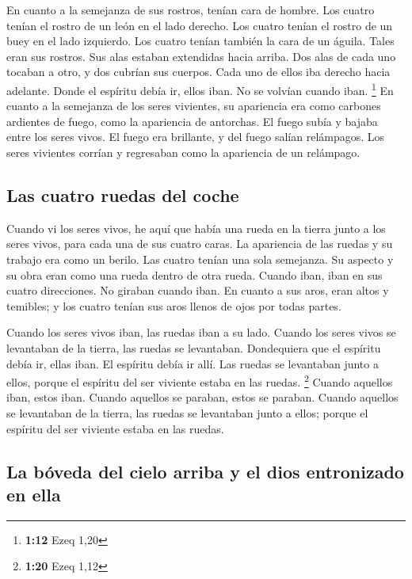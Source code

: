  En cuanto a la semejanza de sus rostros, tenían cara de
hombre. Los cuatro tenían el rostro de un león en el lado derecho. Los
cuatro tenían el rostro de un buey en el lado izquierdo. Los cuatro
tenían también la cara de un águila.  Tales eran sus
rostros. Sus alas estaban extendidas hacia arriba. Dos alas de cada uno
tocaban a otro, y dos cubrían sus cuerpos.  Cada uno de
ellos iba derecho hacia adelante. Donde el espíritu debía ir, ellos
iban. No se volvían cuando iban. \footnote{\textbf{1:12} Ezeq 1,20}
 En cuanto a la semejanza de los seres vivientes, su
apariencia era como carbones ardientes de fuego, como la apariencia de
antorchas. El fuego subía y bajaba entre los seres vivos. El fuego era
brillante, y del fuego salían relámpagos.  Los seres
vivientes corrían y regresaban como la apariencia de un relámpago.

\hypertarget{las-cuatro-ruedas-del-coche}{%
\subsection{Las cuatro ruedas del
coche}\label{las-cuatro-ruedas-del-coche}}

 Cuando vi los seres vivos, he aquí que había una rueda
en la tierra junto a los seres vivos, para cada una de sus cuatro caras.
 La apariencia de las ruedas y su trabajo era como un
berilo. Las cuatro tenían una sola semejanza. Su aspecto y su obra eran
como una rueda dentro de otra rueda.  Cuando iban, iban
en sus cuatro direcciones. No giraban cuando iban.  En
cuanto a sus aros, eran altos y temibles; y los cuatro tenían sus aros
llenos de ojos por todas partes.

 Cuando los seres vivos iban, las ruedas iban a su lado.
Cuando los seres vivos se levantaban de la tierra, las ruedas se
levantaban.  Dondequiera que el espíritu debía ir, ellas
iban. El espíritu debía ir allí. Las ruedas se levantaban junto a ellos,
porque el espíritu del ser viviente estaba en las ruedas. \footnote{\textbf{1:20}
  Ezeq 1,12}  Cuando aquellos iban, estos iban. Cuando
aquellos se paraban, estos se paraban. Cuando aquellos se levantaban de
la tierra, las ruedas se levantaban junto a ellos; porque el espíritu
del ser viviente estaba en las ruedas.

\hypertarget{la-buxf3veda-del-cielo-arriba-y-el-dios-entronizado-en-ella}{%
\subsection{La bóveda del cielo arriba y el dios entronizado en
ella}\label{la-buxf3veda-del-cielo-arriba-y-el-dios-entronizado-en-ella}}

